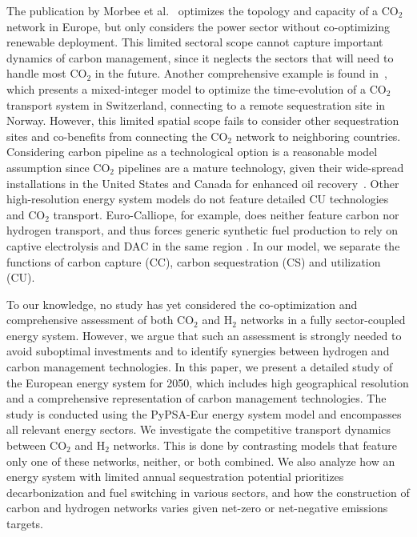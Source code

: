 \documentclass[twocolumn]{article}
\newcommand{\COtwo}{CO$_2$}
\newcommand{\Htwo}{H$_2$}
\begin{document}
The publication by Morbee et al.~\cite{morbeeOptimisedDeploymentEuropean2012} optimizes the topology and capacity of a \COtwo{} network in Europe, but only considers the power sector without co-optimizing renewable deployment. This limited sectoral scope cannot capture important dynamics of carbon management, since it neglects the sectors that will need to handle most \COtwo{} in the future.
Another comprehensive example is found in~\cite{becattiniCarbonDioxideCapture2022}, which presents a mixed-integer model to optimize the time-evolution of a \COtwo{} transport system in Switzerland, connecting to a remote sequestration site in Norway. However, this limited spatial scope fails to consider other sequestration sites and co-benefits from connecting the \COtwo{} network to neighboring countries. Considering carbon pipeline as a technological option is a reasonable model assumption since \COtwo{} pipelines are a mature technology, given their wide-spread installations in the United States and Canada for enhanced oil recovery~\cite{righettiSitingCarbonDioxide2017,friedmannNETZEROGEOSPHERICRETURN}.
Other high-resolution energy system models do not feature detailed CU technologies and \COtwo{} transport. Euro-Calliope, for example, does neither feature carbon nor hydrogen transport, and thus forces generic synthetic fuel production to rely on captive electrolysis and DAC in the same region \cite{pickeringDiversityOptionsEliminate2022}.
In our model, we separate the functions of carbon capture (CC), carbon sequestration (CS) and utilization (CU).

To our knowledge, no study has yet considered the co-optimization and comprehensive assessment of both \COtwo{} and \Htwo{} networks in a fully sector-coupled energy system. However, we argue that such an assessment is strongly needed to avoid suboptimal investments and to identify synergies between hydrogen and carbon management technologies. In this paper, we present a detailed study of the European energy system for 2050, which includes high geographical resolution and a comprehensive representation of carbon management technologies. The study is conducted using the PyPSA-Eur energy system model and encompasses all relevant energy sectors. We investigate the competitive transport dynamics between \COtwo{} and \Htwo{} networks. This is done by contrasting models that feature only one of these networks, neither, or both combined. We also analyze how an energy system with limited annual sequestration potential prioritizes decarbonization and fuel switching in various sectors, and how the construction of carbon and hydrogen networks varies given net-zero or net-negative emissions targets.
\end{document}
